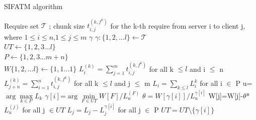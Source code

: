\documentclass{IEEEtran}
\newtheorem{proposition}{\noindent{\bf proposition}}
\begin{document}
 \begin{algorithm} 
 \caption{SIFATM algorithm}
 \begin{algorithmic}[1]\label{offline}
 \renewcommand{\algorithmicrequire}{\textbf{Input: }}
 \renewcommand{\algorithmicensure}{\textbf{Output:}}
 \REQUIRE  Require set $\mathcal{T}$ ;  chunk size $t_{i,j}^{(k,f^k)}$ for the k-th require from server i to client j, 
 where $1 \leqslant i\leqslant n$,$1 \leqslant j \leqslant m$
  \ENSURE  $\gamma$
  \STATE $\gamma:\{1,2,...l\} \gets \mathcal{T}$
  \\ \textit{$UT\gets\{1,2,3...l\}$}
  \\ \textit{$P\gets\{1,2,3...m+n\}$}
  \\ \textit{$W\{1,2,...l\}\gets\{1,1...1\}$}
  \STATE $L_i^{(k)}= \sum_{j=1}^mt_{i,j}^{(k,f^k)}$  for all k $\le l$ and i $\le$ n
   \STATE $L_{j+n}^{(k)}= \sum_{i=1}^nt_{i,j}^{(k,f^k)}$ for all k $\le l$ and j $\le$ m
    \STATE $L_i=\sum_{k \le l}L_i^k$ for all i $\in$ P
  \STATE u=$\arg \max \limits_{k \in P}L_k$
   \STATE $\gamma[i]$=$\arg\min \limits_{F \in UT} W[F]/L_u^{(F)}$
   \STATE $\theta=W[\gamma[i]]/L_{u}^{\gamma[i]}$
   \STATE W[j]=W[j]-$\theta$*$L_u^{(j)}$ for all j $\in UT$
   \STATE $L_j=L_j-L_j^{\gamma[i]}$ for all j $\in$  P
   \STATE $UT = UT \setminus\{\gamma[i]\}$
  \ENDFOR
 \end{algorithmic} 
 
 
 \end{algorithm}
%
%
%
\end{document}
